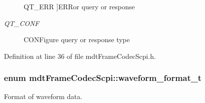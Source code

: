 \begin{Desc}
\begin{description}
{\hypertarget{classmdt_frame_codec_scpi_a2dbce7589140e915f3e253c3523b3b9aa6e1b9ed9dff72df39e3b3fc88611e4a5}{Q\-T\-\_\-\-E\-R\-R}\label{classmdt_frame_codec_scpi_a2dbce7589140e915f3e253c3523b3b9aa6e1b9ed9dff72df39e3b3fc88611e4a5}
}]E\-R\-Ror query or response \item[{\em 
\hypertarget{classmdt_frame_codec_scpi_a2dbce7589140e915f3e253c3523b3b9aa3df0e44b2eeacfad6f93ac9201db101d}{Q\-T\-\_\-\-C\-O\-N\-F}\label{classmdt_frame_codec_scpi_a2dbce7589140e915f3e253c3523b3b9aa3df0e44b2eeacfad6f93ac9201db101d}
}]C\-O\-N\-Figure query or response type \end{description}
\end{Desc}


Definition at line 36 of file mdt\-Frame\-Codec\-Scpi.\-h.

\hypertarget{classmdt_frame_codec_scpi_a0562eccf33d8cf62e7a73a748a70c475}{
\subsubsection[{waveform\-\_\-format\-\_\-t}]{\setlength{\rightskip}{0pt plus 5cm}enum {\bf mdt\-Frame\-Codec\-Scpi\-::waveform\-\_\-format\-\_\-t}}}\label{classmdt_frame_codec_scpi_a0562eccf33d8cf62e7a73a748a70c475}


Format of waveform data. 

